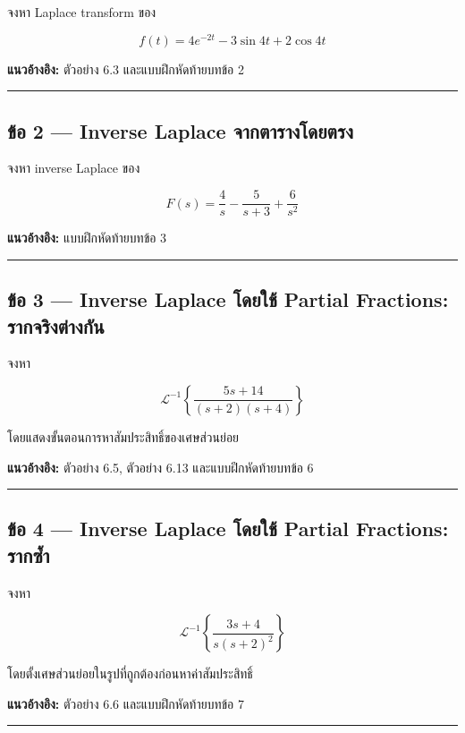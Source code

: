 จงหา Laplace transform ของ

\[
f(t)=4e^{-2t}-3\sin 4t+2\cos 4t
\]

\textbf{แนวอ้างอิง:} ตัวอย่าง 6.3 และแบบฝึกหัดท้ายบทข้อ 2

\par\noindent\rule{\textwidth}{0.4pt}\par

\subsection{ข้อ 2 — Inverse Laplace จากตารางโดยตรง}

จงหา inverse Laplace ของ

\[
F(s)=\frac{4}{s}-\frac{5}{s+3}+\frac{6}{s^2}
\]

\textbf{แนวอ้างอิง:} แบบฝึกหัดท้ายบทข้อ 3

\par\noindent\rule{\textwidth}{0.4pt}\par

\subsection{ข้อ 3 — Inverse Laplace โดยใช้ Partial Fractions: รากจริงต่างกัน}

จงหา

\[
\mathcal{L}^{-1}
\left\{
\frac{5s+14}{(s+2)(s+4)}
\right\}
\]

โดยแสดงขั้นตอนการหาสัมประสิทธิ์ของเศษส่วนย่อย

\textbf{แนวอ้างอิง:} ตัวอย่าง 6.5, ตัวอย่าง 6.13 และแบบฝึกหัดท้ายบทข้อ 6

\par\noindent\rule{\textwidth}{0.4pt}\par

\subsection{ข้อ 4 — Inverse Laplace โดยใช้ Partial Fractions: รากซ้ำ}

จงหา

\[
\mathcal{L}^{-1}
\left\{
\frac{3s+4}{s(s+2)^2}
\right\}
\]

โดยตั้งเศษส่วนย่อยในรูปที่ถูกต้องก่อนหาค่าสัมประสิทธิ์

\textbf{แนวอ้างอิง:} ตัวอย่าง 6.6 และแบบฝึกหัดท้ายบทข้อ 7

\par\noindent\rule{\textwidth}{0.4pt}\par

